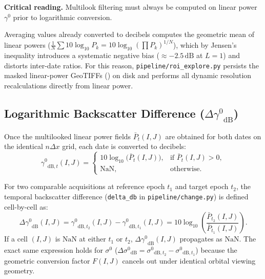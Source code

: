 \documentclass[11pt,a4paper]{article}
\newcommand{\src}[1]{\nolinkurl{#1}}
\newcommand{\unit}[1]{\mathrm{#1}}
\newcommand{\warn}[1]{\par\noindent\colorbox{blue!8}{\parbox{.965\linewidth}{\textbf{Critical reading.} #1}}\par}
\newcommand{\gz}{\ensuremath{\gamma^{0}}}
\newcommand{\sz}{\ensuremath{\sigma^{0}}}
\begin{document}
\begin{cuidado}
\warn{Multilook filtering must always be computed on linear power $\gz$ prior to logarithmic conversion.}
Averaging values already converted to decibels computes the geometric mean of linear powers ($\frac{1}{N}\sum 10\log_{10} P_k = 10\log_{10}(\prod P_k)^{1/N}$), which by Jensen's inequality introduces a systematic negative bias ($\approx -2.5\,\unit{dB}$ at $L=1$) and distorts inter-date ratios. For this reason, \src{pipeline/roi_explore.py} persists the masked linear-power GeoTIFFs () on disk and performs all dynamic resolution recalculations directly from linear power.
\end{cuidado}

\subsection{Logarithmic Backscatter Difference ($\Delta\gz_{\mathrm{dB}}$)}
\label{subsec:cambio-delta-db}

Once the multilooked linear power fields $\bar{P}_t(I,J)$ are obtained for both dates on the identical $n\Delta x$ grid, each date is converted to decibels:
\begin{equation}
  \gz_{\mathrm{dB},t}(I,J) =
  \begin{cases}
    10\log_{10}\!\bigl(\bar{P}_t(I,J)\bigr), & \text{if } \bar{P}_t(I,J) > 0, \\
    \mathrm{NaN}, & \text{otherwise.}
  \end{cases}
  \label{eq:cambio-a-db}
\end{equation}

For two comparable acquisitions at reference epoch $t_1$ and target epoch $t_2$, the temporal backscatter difference (\texttt{delta\_db} in \src{pipeline/change.py}) is defined cell-by-cell as:
\begin{equation}
  \Delta\gz_{\mathrm{dB}}(I,J) = \gz_{\mathrm{dB},t_2}(I,J) - \gz_{\mathrm{dB},t_1}(I,J)
  = 10\log_{10}\!\left(\frac{\bar{P}_{t_2}(I,J)}{\bar{P}_{t_1}(I,J)}\right).
  \label{eq:delta}
\end{equation}
If a cell $(I,J)$ is $\mathrm{NaN}$ at either $t_1$ or $t_2$, $\Delta\gz_{\mathrm{dB}}(I,J)$ propagates as $\mathrm{NaN}$. The exact same expression holds for $\sz$ ($\Delta\sz_{\mathrm{dB}} = \sz_{\mathrm{dB},t_2} - \sz_{\mathrm{dB},t_1}$) because the geometric conversion factor $F(I,J)$ cancels out under identical orbital viewing geometry.
\end{document}
